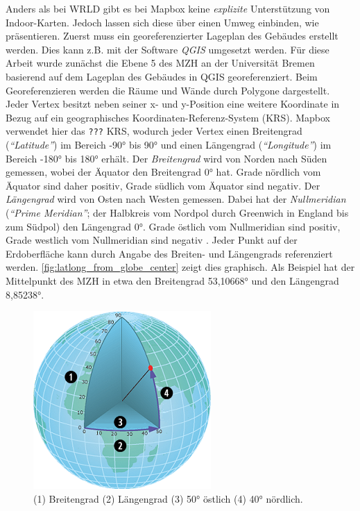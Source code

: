 Anders als bei WRLD gibt es bei Mapbox keine \emph{explizite} Unterstützung von Indoor-Karten.
Jedoch lassen sich diese über einen Umweg einbinden, wie \textcites{Mapbox2018b}{Pavani2018}{Clarke2017} präsentieren.
Zuerst muss ein georeferenzierter Lageplan des Gebäudes erstellt werden.
Dies kann z.B. mit der Software \emph{QGIS} umgesetzt werden.
Für diese Arbeit wurde zunächst die Ebene 5 des MZH an der Universität Bremen basierend auf dem Lageplan des Gebäudes in QGIS georeferenziert.
Beim Georeferenzieren werden die Räume und Wände durch Polygone dargestellt.
Jeder Vertex besitzt neben seiner x- und y-Position eine weitere Koordinate in Bezug auf ein geographisches Koordinaten-Referenz-System (KRS).
Mapbox verwendet hier das \texttt{???} KRS, wodurch jeder Vertex einen Breitengrad (\emph{\enquote{Latitude}}) im Bereich \ang{-90} bis \ang{90} und einen Längengrad (\emph{\enquote{Longitude}}) im Bereich \ang{-180} bis \ang{180} erhält.
Der \emph{Breitengrad} wird von Norden nach Süden gemessen, wobei der Äquator den Breitengrad \ang{0} hat.
Grade nördlich vom Äquator sind daher positiv, Grade südlich vom Äquator sind negativ.
Der \emph{Längengrad} wird von Osten nach Westen gemessen.
Dabei hat der \emph{Nullmeridian} (\emph{\enquote{Prime Meridian}}; der Halbkreis vom Nordpol durch Greenwich in England bis zum Südpol) den Längengrad \ang{0}.
Grade östlich vom Nullmeridian sind positiv, Grade westlich vom Nullmeridian sind negativ \autocite{ESRIInc2018}.
Jeder Punkt auf der Erdoberfläche kann durch Angabe des Breiten- und Längengrads referenziert werden.
\autoref{fig:latlong_from_globe_center} zeigt dies graphisch.
Als Beispiel hat der Mittelpunkt des MZH in etwa den Breitengrad \ang{53,10668} und den Längengrad \ang{8,85238}.

\begin{figure}[t]
    \centering
    \includegraphics[width=0.35\linewidth]{figures/latlong_from_globe_center}
    \caption{(1) Breitengrad (2) Längengrad (3) \ang[detect-weight=true]{50} östlich (4) \ang[detect-weight=true]{40} nördlich. %
    }
    \label{fig:latlong_from_globe_center}
\end{figure}

